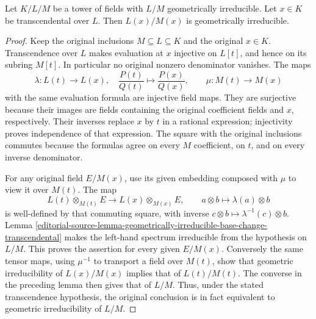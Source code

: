 \begin{lemma}
\label{editorial-source-lemma-geometrically-irreducible-add-transcendental}
Let $K/L/M$ be a tower of fields with $L/M$ geometrically irreducible.
Let $x \in K$ be transcendental over $L$. Then $L(x)/M(x)$ is geometrically
irreducible.
\end{lemma}

\begin{proof}
Keep the original inclusions
$M\subseteq L\subseteq K$ and
the original $x\in K$.
Transcendence over $L$ makes
evaluation at $x$ injective on
$L[t]$, and hence on its subring
$M[t]$. In particular no original
nonzero denominator vanishes.
The maps
$$
\lambda:L(t)\longrightarrow L(x),\quad
\frac{P(t)}{Q(t)}\longmapsto\frac{P(x)}{Q(x)},
\qquad
\mu:M(t)\longrightarrow M(x)
$$
with the same evaluation formula
are injective field maps. They
are surjective because their
images are fields containing the
original coefficient fields and
$x$, respectively. Their inverses
replace $x$ by $t$ in a rational
expression; injectivity proves
independence of that expression.
The square with the original
inclusions commutes because the
formulas agree on every $M$
coefficient, on $t$, and on
every inverse denominator.

For any original field $E/M(x)$,
use its given embedding composed
with $\mu$ to view it over $M(t)$.
The map
$$
L(t)\otimes_{M(t)}E\longrightarrow L(x)\otimes_{M(x)}E,
\qquad a\otimes b\longmapsto\lambda(a)\otimes b
$$
is well-defined by that commuting
square, with inverse
$c\otimes b\mapsto\lambda^{-1}(c)\otimes b$.
Lemma
\ref{editorial-source-lemma-geometrically-irreducible-base-change-transcendental}
makes the left-hand spectrum
irreducible from the hypothesis
on $L/M$. This proves the assertion
for every given $E/M(x)$.
Conversely the same tensor maps,
using $\mu^{-1}$ to transport a
field over $M(t)$, show that
geometric irreducibility of
$L(x)/M(x)$ implies that of
$L(t)/M(t)$. The converse in the
preceding lemma then gives that
of $L/M$. Thus, under the stated
transcendence hypothesis, the
original conclusion is in fact
equivalent to geometric
irreducibility of $L/M$.
\end{proof}